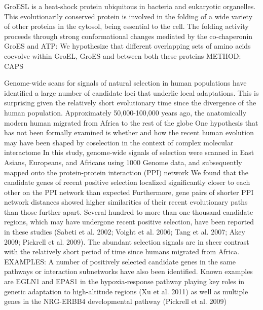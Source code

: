 GroESL is a heat-shock protein ubiquitous in bacteria and eukaryotic organelles. This evolutionarily conserved protein is involved in the folding of a wide variety of other proteins in the cytosol, being essential to the cell.  \cite{ruiz2013coevolution}
The folding activity proceeds through strong conformational changes mediated by the co-chaperonin GroES and ATP: \cite{ruiz2013coevolution}
We hypothesize that different overlapping sets of amino acids coevolve within GroEL, GroES and between both these proteins \cite{ruiz2013coevolution}
METHOD: CAPS \cite{ruiz2013coevolution}



Genome-wide scans for signals of natural selection in human populations have identified a large number of candidate loci that underlie local adaptations. This is surprising given the relatively short evolutionary time since the divergence of the human population. Approximately 50,000-100,000 years ago, the anatomically modern human migrated from Africa to the rest of the globe \cite{qian2015recent}
 One hypothesis that has not been formally examined is whether and how the recent human evolution may have been shaped by coselection in the context of complex molecular interactome \cite{qian2015recent}
In this study, genome-wide signals of selection were scanned in East Asians, Europeans, and Africans using 1000 Genome data, and subsequently mapped onto the protein-protein interaction (PPI) network \cite{qian2015recent}
We found that the candidate genes of recent positive selection localized significantly closer to each other on the PPI network than expected \cite{qian2015recent}
Furthermore, gene pairs of shorter PPI network distances showed higher similarities of their recent evolutionary paths than those further apart.  \cite{qian2015recent}
Several hundred to more than one thousand candidate regions, which may have undergone recent positive selection, have been reported in these studies (Sabeti et al. 2002; Voight et al. 2006; Tang et al. 2007; Akey 2009; Pickrell et al. 2009). The abundant selection signals are in sheer contrast with the relatively short period of time since humans migrated from Africa. \cite{qian2015recent}
EXAMPLES: A number of positively selected candidate genes in the same pathways or interaction subnetworks have also been identified. Known examples are EGLN1 and EPAS1 in the hypoxia-response pathway playing key roles in genetic adaptation to high-altitude regions (Xu et al. 2011) as well as multiple genes in the NRG-ERBB4 developmental pathway (Pickrell et al. 2009) \cite{qian2015recent}
